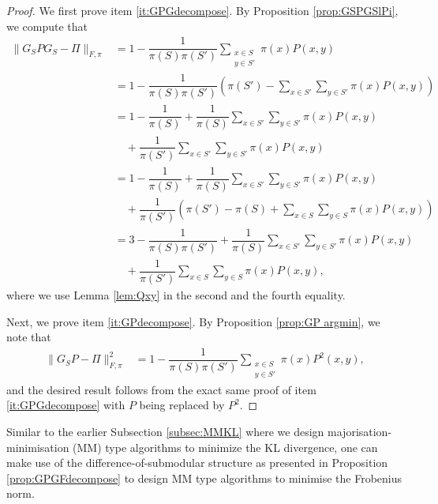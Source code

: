 \documentclass[EJP]{ejpecp} %
\begin{document}
\begin{proof}
    We first prove item \eqref{it:GPGdecompose}. By Proposition \ref{prop:GSPGSlPi}, we compute that
    \begin{align*}
        \|G_SPG_S - \Pi\|_{F, \pi} &= 1 - \dfrac{1}{\pi(S)\pi(S')} \sum_{\substack{x \in S\\ y \in S'}} \pi(x) P(x,y) \\
                                   &= 1 -  \dfrac{1}{\pi(S)\pi(S')} \left(\pi(S') - \sum_{x \in S'} \sum_{y \in S'} \pi(x) P(x,y)\right) \\
                                   &= 1 - \dfrac{1}{\pi(S)} + \dfrac{1}{\pi(S)} \sum_{x \in S'} \sum_{y \in S'} \pi(x) P(x,y) \\
                                   &\quad + \dfrac{1}{\pi(S')} \sum_{x \in S'} \sum_{y \in S'} \pi(x) P(x,y) \\
                                   &= 1 - \dfrac{1}{\pi(S)} + \dfrac{1}{\pi(S)} \sum_{x \in S'} \sum_{y \in S'} \pi(x) P(x,y) \\
                                   &\quad + \dfrac{1}{\pi(S')} \left(\pi(S') - \pi(S) + \sum_{x \in S} \sum_{y \in S} \pi(x) P(x,y)\right) \\
                                   &= 3 - \dfrac{1}{\pi(S)\pi(S')} + \dfrac{1}{\pi(S)} \sum_{x \in S'} \sum_{y \in S'} \pi(x) P(x,y) \\
            &\quad + \dfrac{1}{\pi(S')} \sum_{x \in S} \sum_{y \in S} \pi(x) P(x,y),
    \end{align*}
    where we use Lemma \ref{lem:Qxy} in the second and the fourth equality.

    Next, we prove item \eqref{it:GPdecompose}. By Proposition \ref{prop:GP argmin}, we note that
    \begin{align*}
        \|G_SP - \Pi\|_{F, \pi}^2 &= 1 - \dfrac{1}{\pi(S)\pi(S')} \sum_{\substack{x \in S\\ y \in S'}} \pi(x) P^2(x,y),
    \end{align*}
    and the desired result follows from the exact same proof of item \eqref{it:GPGdecompose} with $P$ being replaced by $P^2$.
\end{proof}

Similar to the earlier Subsection \ref{subsec:MMKL} where we design majorisation-minimisation (MM) type algorithms to minimize the KL divergence, one can make use of the difference-of-submodular structure as presented in Proposition \ref{prop:GPGFdecompose} to design MM type algorithms to minimise the Frobenius norm.
\end{document}
